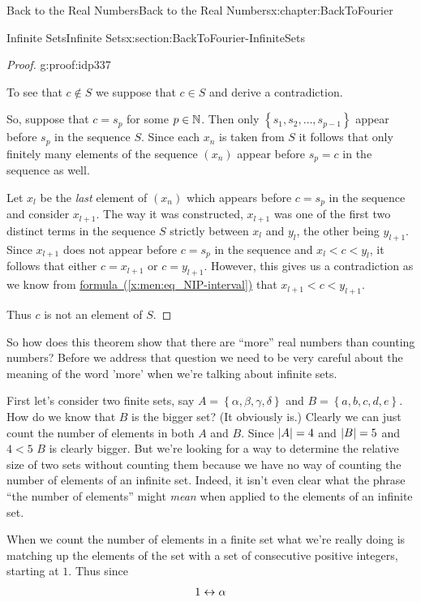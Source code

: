 \begin{chapterptx}{Back to the Real Numbers}{}{Back to the Real Numbers}{}{}{x:chapter:BackToFourier}
\begin{sectionptx}{Infinite Sets}{}{Infinite Sets}{}{}{x:section:BackToFourier-InfiniteSets}
\begin{proof}{}{g:proof:idp337}
			\par
			To see that \(c\not\in S\) we suppose that \(c\in S\) and derive a contradiction.%
			\par
			So, suppose that \(c=s_p\) for some \(p\in\mathbb {N}\). Then only \(\left\{s_1, s_2,\ldots,
			s_{p-1}\right\}\) appear before \(s_p\) in the sequence \(S\). Since each \(x_n\) is taken from \(S\) it follows that only finitely many elements of the sequence \((x_n)\) appear before \(s_p=c\) in the sequence as well.%
			\par
			Let \(x_l\) be the \emph{last} element of \((x_n)\) which appears before \(c=s_p\) in the sequence and consider \(x_{l+1}\). The way it was constructed, \(x_{l+1}\) was one of the first two distinct terms in the sequence \(S\) strictly between \(x_l\) and \(y_l\), the other being \(y_{l+1}\). Since \(x_{l+1}\) does not appear before \(c=s_p\) in the sequence and \(x_l\lt c\lt y_l\), it follows that either \(c=x_{l+1}\) or \(c=y_{l+1}\). However, this gives us a contradiction as we know from \hyperref[x:men:eq_NIP-interval]{formula~({\xreffont\ref{x:men:eq_NIP-interval}})} that \(x_{l+1}\lt c\lt y_{l+1}\).%
			\par
			Thus \(c\) is not an element of \(S\).%
		\end{proof}
		So how does this theorem show that there are ``more'' real numbers than counting numbers? Before we address that question we need to be very careful about the meaning of the word 'more' when we're talking about infinite sets.%
		\par
		First let's consider two finite sets, say \(A=\left\{\alpha,\beta,\gamma,\delta\right\}\) and \(B=\left\{a,b,c,d,e\right\}\). How do we know that \(B\) is the bigger set? (It obviously is.) Clearly we can just count the number of elements in both \(A\) and \(B\). Since \(\left|A\right|=4\) and \(\left|B\right|=5\) and \(4\lt 5\) \(B\) is clearly bigger. But we're looking for a way to determine the relative size of two sets without counting them because we have no way of counting the number of elements of an infinite set. Indeed, it isn't even clear what the phrase ``the number of elements'' might \emph{mean} when applied to the elements of an infinite set.%
		\par
		When we count the number of elements in a finite set what we're really doing is matching up the elements of the set with a set of consecutive positive integers, starting at \(1\). Thus since%
		\begin{align*}
			1\amp \leftrightarrow\alpha\\

\end{align*}
\end{sectionptx}
\end{chapterptx}
